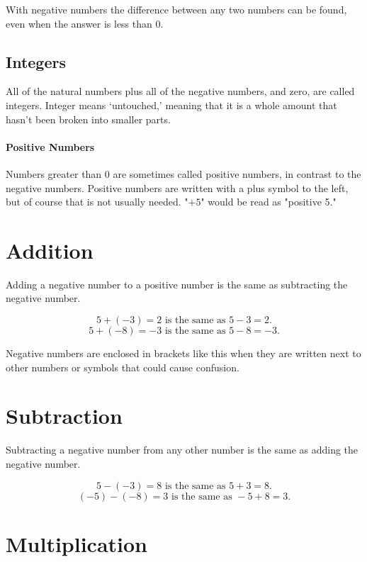\documentclass{article}
\begin{document}
\vspace{32pt}
 With negative numbers the difference between any two numbers can be found, even when the answer is less than 0.\\
 
\newpage

\subsection*{Integers} 
All of the natural numbers plus all of the negative numbers, and zero, are called integers. Integer means ‘untouched,’ meaning that it is a whole amount that hasn't been broken into smaller parts.

\paragraph{Positive Numbers}
Numbers greater than 0 are sometimes called positive numbers, in contrast to the negative numbers. Positive numbers are written with a plus symbol to the left, but of course that is not usually needed. "$+5$" would be read as "positive 5."

\newpage

\section*{Addition}

Adding a negative number to a positive number is the same as subtracting the negative number.

$$5+(-3)=2 \textrm{ is the same as } 5-3=2.$$
$$5+(-8)=-3 \textrm{ is the same as } 5-8=-3.$$

Negative numbers are enclosed in brackets like this when they are written next to other numbers or symbols that could cause confusion.

\section*{Subtraction}

Subtracting a negative number from any other number is the same as adding the negative number.

$$5-(-3)=8 \textrm{ is the same as } 5+3=8.$$
$$(-5)-(-8)=3 \textrm{ is the same as } -5+8=3.$$

\section*{Multiplication}
\end{document}
